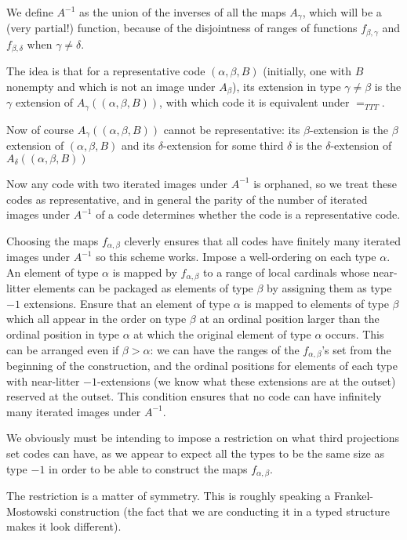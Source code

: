 \documentclass{slides}
\begin{document}
\begin{slide}

We define $A^{-1}$ as the union of the inverses of all the maps $A_\gamma$, which will be a (very partial!) function, because of the disjointness of ranges of functions $f_{\beta,\gamma}$ and $f_{\beta,\delta}$ when $\gamma\neq \delta$.

The idea is that for a representative code $(\alpha,\beta,B)$ (initially, one with $B$ nonempty and which is not an image
under $A_\beta$), its extension in type $\gamma \neq \beta$ is the $\gamma$ extension of $A_\gamma((\alpha,\beta,B))$, with which code it is equivalent under $=_{TTT}$.

Now of course $A_\gamma((\alpha,\beta,B))$ cannot be representative:  its $\beta$-extension is the $\beta$ extension of $(\alpha,\beta,B)$ and its $\delta$-extension for some third $\delta$ is the $\delta$-extension of $A_\delta((\alpha,\beta,B))$

Now any code with two iterated images under $A^{-1}$ is orphaned, so we treat these codes as representative, and in general the parity
of the number of iterated images under $A^{-1}$ of a code determines whether the code is a representative code.

Choosing the maps $f_{\alpha,\beta}$ cleverly ensures that all codes have finitely many iterated images under $A^{-1}$ so
this scheme works.  Impose a well-ordering on each type $\alpha$.  An element of type $\alpha$ is mapped by $f_{\alpha,\beta}$
to a range of local cardinals whose near-litter elements can be packaged as elements of type $\beta$ by assigning them as type $-1$ extensions.  Ensure that an element of type $\alpha$ is mapped to elements of type $\beta$ which all appear in the order on type $\beta$ at an ordinal position larger than the ordinal position in type $\alpha$ at which the original element of type $\alpha$ occurs.  This can be arranged even if $\beta>\alpha$:  we can have the ranges of the $f_{\alpha,\beta}$'s set from the beginning of the construction, and the ordinal positions for elements of each type with near-litter $-1$-extensions (we know what these extensions are at the outset) reserved at the outset.  This condition ensures that no code can have infinitely many iterated images under $A^{-1}$.

\end{slide}

\begin{slide}

We obviously must be intending to impose a restriction on what third projections set codes can have, as we appear to expect all the types to be the same size as type $-1$ in order to be able to construct the maps $f_{\alpha,\beta}$.

The restriction is a matter of symmetry.  This is roughly speaking a Frankel-Mostowski construction (the fact that we
are conducting it in a typed structure makes it look different).

\end{slide}
\end{document}
